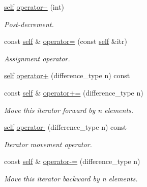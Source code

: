\begin{Indent}
\begin{DoxyCompactItemize}
\mbox{\hyperlink{classGis__wkb__vector__const__iterator}{self}} \mbox{\hyperlink{classGis__wkb__vector__const__iterator_a979655b875007b53d94dcf03065f88d8}{operator-\/-\/}} (int)
\begin{DoxyCompactList}\small\item\em Post-\/decrement. \end{DoxyCompactList}\item 
const \mbox{\hyperlink{classGis__wkb__vector__const__iterator}{self}} \& \mbox{\hyperlink{classGis__wkb__vector__const__iterator_a986cd729d4632f8c7992a424226d6cf6}{operator=}} (const \mbox{\hyperlink{classGis__wkb__vector__const__iterator}{self}} \&itr)
\begin{DoxyCompactList}\small\item\em Assignment operator. \end{DoxyCompactList}\item 
\mbox{\hyperlink{classGis__wkb__vector__const__iterator}{self}} \mbox{\hyperlink{classGis__wkb__vector__const__iterator_a56ceef1b31e06b9dd58207de7bd0f20d}{operator+}} (difference\+\_\+type n) const
\item 
const \mbox{\hyperlink{classGis__wkb__vector__const__iterator}{self}} \& \mbox{\hyperlink{classGis__wkb__vector__const__iterator_a1b985aee8037b4fbe3aed2359f95dd57}{operator+=}} (difference\+\_\+type n)
\begin{DoxyCompactList}\small\item\em Move this iterator forward by n elements. \end{DoxyCompactList}\item 
\mbox{\hyperlink{classGis__wkb__vector__const__iterator}{self}} \mbox{\hyperlink{classGis__wkb__vector__const__iterator_ae63bd3cedff9cb57e5d6c45cb5ef4dff}{operator-\/}} (difference\+\_\+type n) const
\begin{DoxyCompactList}\small\item\em Iterator movement operator. \end{DoxyCompactList}\item 
const \mbox{\hyperlink{classGis__wkb__vector__const__iterator}{self}} \& \mbox{\hyperlink{classGis__wkb__vector__const__iterator_a9a679f7fb5602553fadd480b08bee2f8}{operator-\/=}} (difference\+\_\+type n)
\begin{DoxyCompactList}\small\item\em Move this iterator backward by n elements. \end{DoxyCompactList}\end{DoxyCompactItemize}
\end{Indent}
